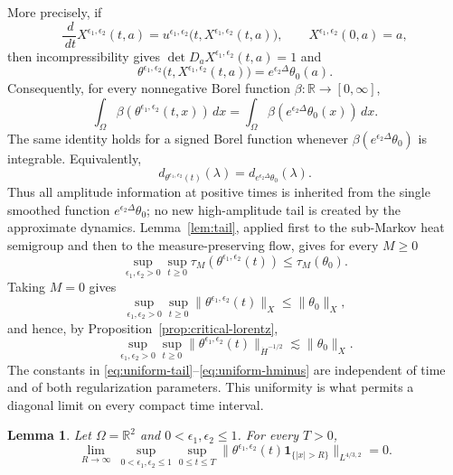 \documentclass[11pt,reqno]{amsproc}
\newtheorem{lemma}{Lemma}[section]
\newcommand{\R}{\mathbb R}
\newcommand{\Om}{\Omega}
\newcommand{\one}{\mathbf 1}
\newcommand{\dd}{\,d}
\begin{document}
More precisely, if
\[
  \frac{\dd}{\dd t}X^{\epsilon_1,\epsilon_2}(t,a)
  =u^{\epsilon_1,\epsilon_2}
  \bigl(t,X^{\epsilon_1,\epsilon_2}(t,a)\bigr),
  \qquad X^{\epsilon_1,\epsilon_2}(0,a)=a,
\]
then incompressibility gives
$\det D_aX^{\epsilon_1,\epsilon_2}(t,a)=1$ and
\[
  \theta^{\epsilon_1,\epsilon_2}
  \bigl(t,X^{\epsilon_1,\epsilon_2}(t,a)\bigr)
  =e^{\epsilon_2\Delta}\theta_0(a).
\]
Consequently, for every nonnegative Borel function
$\beta:\R\to[0,\infty]$,
\begin{equation}\label{eq:renormalized-approximation}
  \int_\Om \beta(\theta^{\epsilon_1,\epsilon_2}(t,x))\dd x
  =
  \int_\Om \beta(e^{\epsilon_2\Delta}\theta_0(x))\dd x.
\end{equation}
The same identity holds for a signed Borel function whenever
$\beta(e^{\epsilon_2\Delta}\theta_0)$ is integrable.
Equivalently,
\begin{equation}\label{eq:distribution-approximation}
  d_{\theta^{\epsilon_1,\epsilon_2}(t)}(\lambda)
  =d_{e^{\epsilon_2\Delta}\theta_0}(\lambda).
\end{equation}
Thus all amplitude information at positive times is inherited from the single
smoothed function $e^{\epsilon_2\Delta}\theta_0$; no new high-amplitude tail is
created by the approximate dynamics.  Lemma~\ref{lem:tail}, applied first to
the sub-Markov heat semigroup and then to the measure-preserving flow, gives
for every $M\ge0$
\begin{equation}\label{eq:uniform-tail}
  \sup_{\epsilon_1,\epsilon_2>0}\sup_{t\ge0}
  \tau_M(\theta^{\epsilon_1,\epsilon_2}(t))
  \le \tau_M(\theta_0).
\end{equation}
Taking $M=0$ gives
\begin{equation}\label{eq:uniform-lorentz}
  \sup_{\epsilon_1,\epsilon_2>0}\sup_{t\ge0}
  \|\theta^{\epsilon_1,\epsilon_2}(t)\|_X
  \le \|\theta_0\|_X,
\end{equation}
and hence, by Proposition~\ref{prop:critical-lorentz},
\begin{equation}\label{eq:uniform-hminus}
  \sup_{\epsilon_1,\epsilon_2>0}\sup_{t\ge0}
  \|\theta^{\epsilon_1,\epsilon_2}(t)\|_{\dot H^{-1/2}}
  \lesssim \|\theta_0\|_X.
\end{equation}
The constants in \eqref{eq:uniform-tail}--\eqref{eq:uniform-hminus} are
independent of time and of both regularization parameters.  This uniformity is
what permits a diagonal limit on every compact time interval.

\begin{lemma}\label{lem:whole-space-tightness}
Let $\Om=\R^2$ and  $0<\epsilon_1,\epsilon_2\le1$.  For every
$T>0$,
\begin{equation}\label{eq:whole-space-tightness}
 \lim_{R\to\infty}\ \sup_{0<\epsilon_1,\epsilon_2\le1}
 \sup_{0\le t\le T}
 \|\theta^{\epsilon_1,\epsilon_2}(t)\one_{\{|x|>R\}}\|_{L^{4/3,2}}=0.
\end{equation}
\end{lemma}
\end{document}
